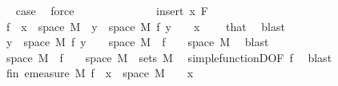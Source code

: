 \begin{isabellebody}
\ \isamarkupfalse%
\ {\isacharquery}{\kern0pt}case\ \isamarkupfalse%
\ force\ \isanewline
\ \ \ \ \isacommand{{\isacharbraceright}{\kern0pt}}\isamarkupfalse%
\isanewline
\ \ \isamarkupfalse%
\isanewline
\ \ \ \ \isamarkupfalse%
\ {\isacharparenleft}{\kern0pt}insert\ x\ F{\isacharparenright}{\kern0pt}\isanewline
\ \ \ \ \isamarkupfalse%
\ {\isachardoublequoteopen}{\isacharparenleft}{\kern0pt}f\ {\isacharminus}{\kern0pt}{\isacharbackquote}{\kern0pt}\ {\isacharbraceleft}{\kern0pt}x{\isacharbraceright}{\kern0pt}\ {\isasyminter}\ space\ M{\isacharparenright}{\kern0pt}\ {\isasymsubseteq}\ {\isacharbraceleft}{\kern0pt}y\ {\isasymin}\ space\ M{\isachardot}{\kern0pt}\ f\ y\ {\isasymnoteq}\ {}{\isacharbraceright}{\kern0pt}{\isachardoublequoteclose}\ \ {\isachardoublequoteopen}x\ {\isasymnoteq}\ {}{\isachardoublequoteclose}\ \isamarkupfalse%
\ that\ \isamarkupfalse%
\ blast\isanewline
\ \ \ \ \isamarkupfalse%
\ \isamarkupfalse%
\ {\isachardoublequoteopen}{\isacharbraceleft}{\kern0pt}y\ {\isasymin}\ space\ M{\isachardot}{\kern0pt}\ f\ y\ {\isasymnoteq}\ {}{\isacharbraceright}{\kern0pt}\ {\isacharequal}{\kern0pt}\ space\ M\ {\isacharminus}{\kern0pt}\ {\isacharparenleft}{\kern0pt}f\ {\isacharminus}{\kern0pt}{\isacharbackquote}{\kern0pt}\ {\isacharbraceleft}{\kern0pt}{}{\isacharbraceright}{\kern0pt}\ {\isasyminter}\ space\ M{\isacharparenright}{\kern0pt}{\isachardoublequoteclose}\ \isamarkupfalse%
\ blast\isanewline
\ \ \ \ \isamarkupfalse%
\ \isamarkupfalse%
\ {\isachardoublequoteopen}space\ M\ {\isacharminus}{\kern0pt}\ {\isacharparenleft}{\kern0pt}f\ {\isacharminus}{\kern0pt}{\isacharbackquote}{\kern0pt}\ {\isacharbraceleft}{\kern0pt}{}{\isacharbraceright}{\kern0pt}\ {\isasyminter}\ space\ M{\isacharparenright}{\kern0pt}\ {\isasymin}\ sets\ M{\isachardoublequoteclose}\ \isamarkupfalse%
\ simple{\isacharunderscore}{\kern0pt}functionD{\isacharparenleft}{\kern0pt}{}{\isacharparenright}{\kern0pt}{\isacharbrackleft}{\kern0pt}OF\ f{\isacharparenleft}{\kern0pt}{}{\isacharparenright}{\kern0pt}{\isacharbrackright}{\kern0pt}\ \isamarkupfalse%
\ blast\isanewline
\ \ \ \ \isamarkupfalse%
\ \isamarkupfalse%
\ fin{\isacharunderscore}{\kern0pt}{}{\isacharcolon}{\kern0pt}\ {\isachardoublequoteopen}emeasure\ M\ {\isacharparenleft}{\kern0pt}f\ {\isacharminus}{\kern0pt}{\isacharbackquote}{\kern0pt}\ {\isacharbraceleft}{\kern0pt}x{\isacharbraceright}{\kern0pt}\ {\isasyminter}\ space\ M{\isacharparenright}{\kern0pt}\ {\isacharless}{\kern0pt}\ {\isasyminfinity}{\isachardoublequoteclose}\ \ {\isachardoublequoteopen}x\ {\isasymnoteq}\ {}{\isachardoublequoteclose}\ \isamarkupfalse%

\end{isabellebody}
